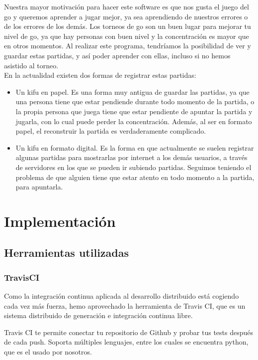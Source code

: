 \documentclass[12pt,a4paper]{report}
\begin{document}
Nuestra mayor motivación para hacer este software es que nos gusta el juego del
go y queremos aprender a jugar mejor, ya sea aprendiendo de nuestros errores o de los
errores de los demás. Los torneos de go son un buen lugar para mejorar tu nivel
de go, ya que hay personas con buen nivel y la concentración es mayor que en
otros momentos. 
Al realizar este programa, tendríamos la posibilidad de ver y
guardar estas partidas, y así poder aprender con ellas, incluso si no hemos
asistido al torneo.
\\
En la actualidad existen dos formas de registrar estas partidas: 
\begin{itemize}
\item Un kifu en papel. Es una forma muy antigua de guardar las partidas, ya que
una persona tiene que estar pendiende durante todo momento de la partida, o la
propia persona que juega tiene que estar pendiente de apuntar la partida y
jugarla, con lo cual puede perder la concentración. Además, al ser en formato
papel, el reconstruir la partida es verdaderamente complicado. 
\item Un kifu en formato digital. Es la forma en que actualmente se suelen
registrar algunas partidas para mostrarlas por internet a los demás usuarios, a
través de servidores en los que se pueden ir subiendo partidas. Seguimos
teniendo el problema de que alguien tiene que estar atento en todo momento a la
partida, para apuntarla. 
\end{itemize}



\chapter{Implementación}

\section{Herramientas utilizadas}

\subsection{TravisCI}

Como la integración continua aplicada al desarrollo distribuido está cogiendo
cada vez más fuerza, hemo aprovechado la herramienta de Travis CI, que es un
sistema distribuido de generación e integración continua libre.

Travis CI te permite conectar tu repositorio de Github y probar tus tests
después de cada push. Soporta múltiples lenguajes, entre los cuales se 
encuentra python, que es el usado por nosotros.
\end{document}
